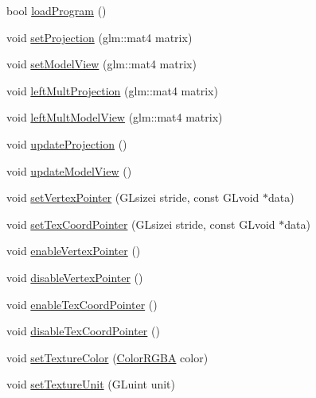 \begin{DoxyCompactItemize}
\item 
bool \hyperlink{class_basic_textured_polygon_shader_a96372bf0373a1b0a98f65bd38f1842c5}{load\+Program} ()
\item 
void \hyperlink{class_basic_textured_polygon_shader_a223de474ef7bd56c994a35b7a8e79a31}{set\+Projection} (glm\+::mat4 matrix)
\item 
void \hyperlink{class_basic_textured_polygon_shader_a3f9a989cd2128d783d6c7c55b9a85119}{set\+Model\+View} (glm\+::mat4 matrix)
\item 
void \hyperlink{class_basic_textured_polygon_shader_a6958c422c6aaddac499823cf034bf1a2}{left\+Mult\+Projection} (glm\+::mat4 matrix)
\item 
void \hyperlink{class_basic_textured_polygon_shader_a86fa69bdffa569d870baa24f62cfbe64}{left\+Mult\+Model\+View} (glm\+::mat4 matrix)
\item 
void \hyperlink{class_basic_textured_polygon_shader_a70d59898e2a090537c025c613991d0e8}{update\+Projection} ()
\item 
void \hyperlink{class_basic_textured_polygon_shader_a39d297fb898feaf1484945c9674cbbeb}{update\+Model\+View} ()
\item 
void \hyperlink{class_basic_textured_polygon_shader_ad8e2bdc1ddf7a66d52e1689a27e58a56}{set\+Vertex\+Pointer} (G\+Lsizei stride, const G\+Lvoid $\ast$data)
\item 
void \hyperlink{class_basic_textured_polygon_shader_a8fa5026aea4a341b5615cd21926b6f9a}{set\+Tex\+Coord\+Pointer} (G\+Lsizei stride, const G\+Lvoid $\ast$data)
\item 
void \hyperlink{class_basic_textured_polygon_shader_a418b2fef8e5d20c1dc701b905ed69756}{enable\+Vertex\+Pointer} ()
\item 
void \hyperlink{class_basic_textured_polygon_shader_abb7f62c6d45ea55e10b7bb36f95e904a}{disable\+Vertex\+Pointer} ()
\item 
void \hyperlink{class_basic_textured_polygon_shader_a6a808286f502afb7764764a03902fc63}{enable\+Tex\+Coord\+Pointer} ()
\item 
void \hyperlink{class_basic_textured_polygon_shader_afc590e102d76ec81e3111bf89c84d548}{disable\+Tex\+Coord\+Pointer} ()
\item 
void \hyperlink{class_basic_textured_polygon_shader_a82ed488e6b9e7c2562b1ff6e8fa5c78f}{set\+Texture\+Color} (\hyperlink{class_color_r_g_b_a}{Color\+R\+G\+B\+A} color)
\item 
void \hyperlink{class_basic_textured_polygon_shader_a1e482c3dcdd464d8d55432d9adf9a29c}{set\+Texture\+Unit} (G\+Luint unit)
\end{DoxyCompactItemize}
